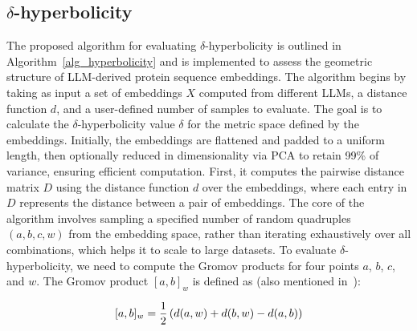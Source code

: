 \documentclass[]{Liebert_Author_revised}
\begin{document}
\subsection{$\delta$-hyperbolicity}
The proposed algorithm for evaluating $\delta$-hyperbolicity is outlined in Algorithm~\ref{alg_hyperbolicity}  and is implemented to assess the geometric structure of LLM-derived protein sequence embeddings.
The algorithm begins by taking as input a set of embeddings \(X\) computed from different LLMs, a distance function \(d\), and a user-defined number of samples to evaluate. The goal is to calculate the $\delta$-hyperbolicity value \(\delta\) for the metric space defined by the embeddings. Initially, the embeddings are flattened and padded to a uniform length, then optionally reduced in dimensionality via PCA to retain 99\% of variance, ensuring efficient computation.
First, it computes the pairwise distance matrix \(D\) using the distance function \(d\) over the embeddings, where each entry in \(D\) represents the distance between a pair of embeddings. 
The core of the algorithm involves sampling a specified number of random quadruples \((a, b, c, w)\) from the embedding space, rather than iterating exhaustively over all combinations, which helps it to scale to large datasets.  
To evaluate $\delta$-hyperbolicity, we need to compute the Gromov products for four points \(a\), \(b\), \(c\), and \(w\). The Gromov product \([a, b]_w\) is defined as (also mentioned in~\citeauthor{yang2024enhancing}):

\begin{equation}
\label{gromov_dist_eq1}
\scriptsize
[a, b]_w = \frac{1}{2} \left(d(a, w) + d(b, w) - d(a, b)\right)
\end{equation}
\end{document}
